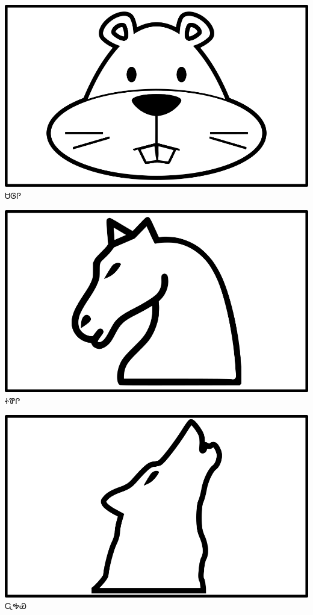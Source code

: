 \documentclass[avery5371]{flashcards}%
\begin{document}
\begin{flashcard}{
\includegraphics[width=0.95\columnwidth,height=.51\columnwidth,keepaspectratio]{../artwork/objects-animate/saloli}
}
\Huge ᏌᎶᎵ
\end{flashcard}

\begin{flashcard}{
\includegraphics[width=0.95\columnwidth,height=.51\columnwidth,keepaspectratio]{../artwork/objects-animate/soquili}
}
\Huge ᏐᏈᎵ
\end{flashcard}

\begin{flashcard}{
\includegraphics[width=0.95\columnwidth,height=.51\columnwidth,keepaspectratio]{../artwork/objects-animate/wahya}
}
\Huge ᏩᎭᏯ
\end{flashcard}
\end{document}
